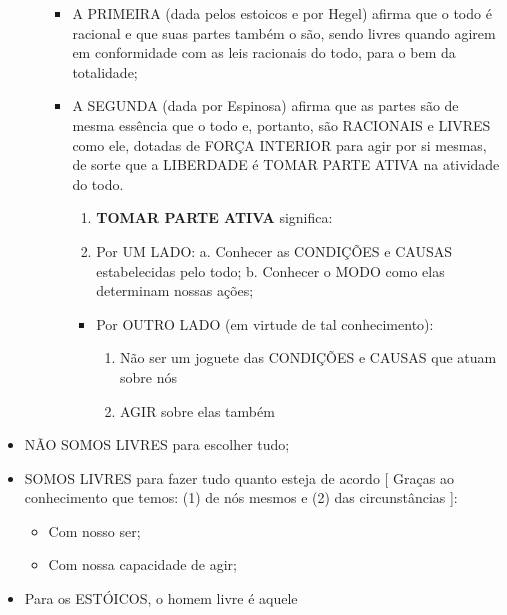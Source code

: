 \documentclass[
]{book}
\providecommand{\tightlist}{%
  \setlength{\itemsep}{0pt}\setlength{\parskip}{0pt}}
\begin{document}
\begin{itemize}
\begin{itemize}
    \begin{itemize}
    \tightlist
    \item
      A PRIMEIRA (dada pelos estoicos e por Hegel) afirma que o todo é
      racional e que suas partes também o são, sendo livres quando
      agirem em conformidade com as leis racionais do todo, para o bem
      da totalidade;
    \item
      A SEGUNDA (dada por Espinosa) afirma que as partes são de mesma
      essência que o todo e, portanto, são RACIONAIS e LIVRES como ele,
      dotadas de FORÇA INTERIOR para agir por si mesmas, de sorte que a
      LIBERDADE é TOMAR PARTE ATIVA na atividade do todo.

      \begin{enumerate}
      \def\labelenumi{\alph{enumi}.}
      \tightlist
      \item
        \textbf{TOMAR PARTE ATIVA} significa:
      \item
        Por UM LADO: a. Conhecer as CONDIÇÕES e CAUSAS estabelecidas
        pelo todo; b. Conhecer o MODO como elas determinam nossas ações;
      \end{enumerate}

      \begin{itemize}
      \tightlist
      \item
        Por OUTRO LADO (em virtude de tal conhecimento):

        \begin{enumerate}
        \def\labelenumi{\alph{enumi}.}
        \tightlist
        \item
          Não ser um joguete das CONDIÇÕES e CAUSAS que atuam sobre nós
        \item
          AGIR sobre elas também
        \end{enumerate}
      \end{itemize}
    \end{itemize}
  \end{itemize}
\item
  NÃO SOMOS LIVRES para escolher tudo;
\item
  SOMOS LIVRES para fazer tudo quanto esteja de acordo {[} Graças ao
  conhecimento que temos: (1) de nós mesmos e (2) das circunstâncias
  {]}:

  \begin{itemize}
  \tightlist
  \item
    Com nosso ser;
  \item
    Com nossa capacidade de agir;
  \end{itemize}
\item
  Para os ESTÓICOS, o homem livre é aquele


\end{itemize}
\end{document}
